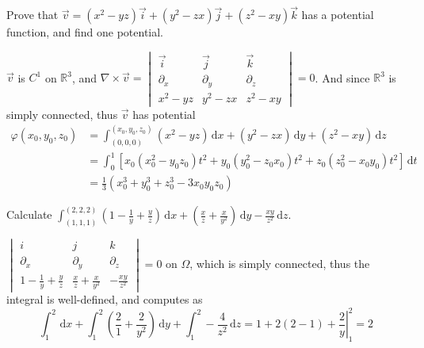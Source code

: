 \begin{example}
    Prove that $\overrightarrow{v}=(x^2-yz)\overrightarrow{i}+(y^2-zx)\overrightarrow{j}+(z^2-xy)\overrightarrow{k}$ has a potential function, and find one potential.

    $\overrightarrow{v}$ is $C^1$ on $\mathbb{R}^3$, and $\nabla\times\overrightarrow{v}=\begin{vmatrix}
            \overrightarrow{i} & \overrightarrow{j} & \overrightarrow{k} \\
            \partial_x         & \partial_y         & \partial_z         \\
            x^2-yz             & y^2-zx             & z^2-xy
        \end{vmatrix}=0$. And since $\mathbb{R}^3$ is simply connected, thus $\overrightarrow{v}$ has potential
    \begin{align*}
        \varphi(x_0,y_0,z_0)
         & =\int_{(0,0,0)}^{(x_0,y_0,z_0)}(x^2-yz)\,\mathrm{d}x+(y^2-zx)\,\mathrm{d}y+(z^2-xy)\,\mathrm{d}z                                   \\
         & =\int_0^1\left[x_0\left(x_0^2-y_0z_0\right)t^2+y_0\left(y_0^2-z_0x_0\right)t^2+z_0\left(z_0^2-x_0y_0\right)t^2\right]\,\mathrm{d}t \\
         & =\frac{1}{3}\left(x_0^3+y_0^3+z_0^3-3x_0y_0z_0\right)
    \end{align*}
\end{example}

\begin{example}
    Calculate $\int_{(1,1,1)}^{(2,2,2)}\left(1-\frac{1}{y}+\frac{y}{z}\right)\,\mathrm{d}x+\left(\frac{x}{z}+\frac{x}{y^2}\right)\,\mathrm{d}y-\frac{xy}{z^2}\,\mathrm{d}z$.

    $\begin{vmatrix}
            i                         & j                         & k               \\
            \partial_x                & \partial_y                & \partial_z      \\
            1-\frac{1}{y}+\frac{y}{z} & \frac{x}{z}+\frac{x}{y^2} & -\frac{xy}{z^2}
        \end{vmatrix}=0$ on $\Omega$, which is simply connected, thus the integral is well-defined, and computes as
    $$\int_1^2\,\mathrm{d}x+\int_1^2\left(\frac{2}{1}+\frac{2}{y^2}\right)\,\mathrm{d}y+\int_1^2-\frac{4}{z^2}\,\mathrm{d}z=\left.1+2(2-1)+\frac{2}{y}\right|_1^2=2$$
\end{example}